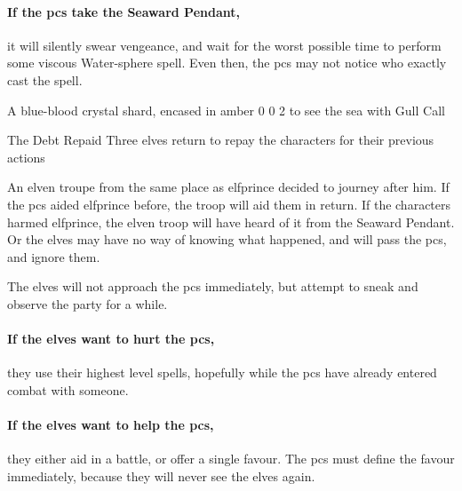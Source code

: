 \paragraph{If the \glspl{pc} take the Seaward Pendant,}
it will silently swear vengeance, and wait for the worst possible time to perform some viscous Water-\gls{sphere} \gls{spell}.
Even then, the \glspl{pc} may not notice who exactly cast the spell.

  {A blue-blood crystal shard, encased in amber}%
  {0}%
  {0}%
  {2}%
  {to see the sea with }%
  {Gull Call}%
  {
    \setcounter{Water}{3}
    \setcounter{Vigilance}{2}
    \setcounter{Performance}{1}
    \setcounter{Survival}{1}
  }%

\showStdSpells

\elfprince

\showStdSpells

{\squash The Debt Repaid}%
{Three elves return to repay the characters for their previous actions}%
\label{karmaElves}

An elven troupe from the same place as \gls{elfprince} decided to journey after him.
If the \glspl{pc} aided \gls{elfprince} before, the troop will aid them in return.
If the characters harmed \gls{elfprince}, the elven troop will have heard of it from the Seaward Pendant.
Or the elves may have no way of knowing what happened, and will pass the \glspl{pc}, and ignore them.

The elves will not approach the \glspl{pc} immediately, but attempt to sneak and observe the party for a while.

\paragraph{If the elves want to hurt the \glspl{pc},}
they use their highest level spells, hopefully while the \glspl{pc} have already entered combat with someone.

\paragraph{If the elves want to help the \glspl{pc},}
they either aid in a battle, or offer a single favour.
The \glspl{pc} must define the favour immediately, because they will never see the elves again.


